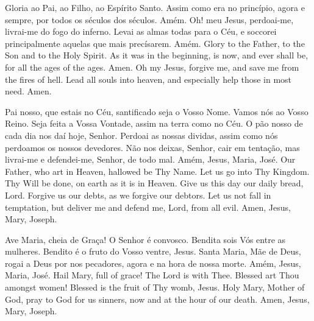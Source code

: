   \beginverse
    \parspace
    Gloria ao Pai, ao Filho, ao Espírito Santo.
    Assim como era no princípio, agora e sempre,
    por todos os séculos dos séculos.
    \parspace
    Amém.
    \parspace\parspace
    Oh! meu Jesus, perdoai-me, livrai-me do fogo do
    inferno. Levai as almas todas para o Céu, e soccorei
    principalmente aquelas que mais precísarem.
    \parspace
    Amém.
  \endverse
  \beginverse
    \parspace
    Glory to the Father, to the Son and to the Holy Spirit.
    As it was in the beginning, is now, and ever shall be,
    for all the ages of the ages.
    \parspace
    Amen.
    \parspace\parspace
    Oh my Jesus, forgive me, and save me from the fires
    of hell. Lead all souls into heaven, and especially
    help those in most need.
    \parspace
    Amen.
  \endverse
\endsong


  \beginverse
    Pai nosso,
    que estais no Céu,
    santificado seja o Vosso Nome.
    Vamos nós ao Vosso Reino.
    Seja feita a Vossa Vontade,
    assim na terra como no Céu.
    O pão nosso de cada dia nos daí hoje, Senhor.
    Perdoai as nossas dividas,
    assim como nós perdoamos os nossos devedores.
    Não nos deixas, Senhor, cair em tentação,
    mas livrai-me e defendei-me, Senhor,
    de todo mal.
    \parspace
    Amém, Jesus, Maria, José.
  \endverse
  \beginverse
    Our Father,
    who art in Heaven,
    hallowed be Thy Name.
    Let us go into Thy Kingdom.
    Thy Will be done,
    on earth as it is in Heaven.
    Give us this day our daily bread, Lord.
    Forgive us our debts,
    as we forgive our debtors.
    Let us not fall in temptation,
    but deliver me and defend me, Lord,
    from all evil.
    \parspace
    Amen, Jesus, Mary, Joseph.
  \endverse
\endsong


  \beginverse
    Ave Maria,
    cheia de Graça!
    O Senhor é convosco.
    Bendita sois Vós entre as mulheres.
    Bendito é o fruto do Vosso ventre, Jesus.
    Santa Maria, Mãe de Deus,
    rogai a Deus por nos pecadores,
    agora e na hora de nossa morte.
    \parspace
    Amém, Jesus, Maria, José.
  \endverse
  \beginverse
    Hail Mary,
    full of grace!
    The Lord is with Thee.
    Blessed art Thou amongst women!
    Blessed is the fruit of Thy womb, Jesus.
    Holy Mary, Mother of God,
    pray to God for us sinners,
    now and at the hour of our death.
    \parspace
    Amen, Jesus, Mary, Joseph.
  \endverse
\endsong


